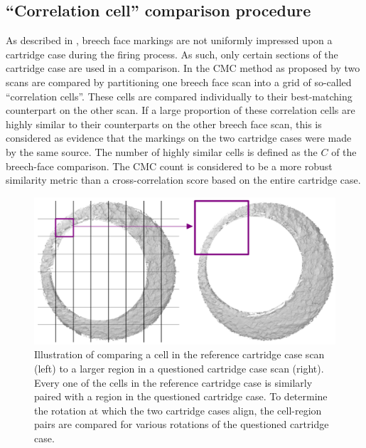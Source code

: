 \hypertarget{comparisonProcedure}{%
\subsection{``Correlation cell'' comparison
procedure}\label{comparisonProcedure}}

As described in \citet{song_proposed_2013}, breech face markings are not
uniformly impressed upon a cartridge case during the firing process. As
such, only certain sections of the cartridge case are used in a
comparison. In the CMC method as proposed by \citet{song_proposed_2013}
two scans are compared by partitioning one breech face scan into a grid
of so-called ``correlation cells''. These cells are compared
individually to their best-matching counterpart on the other scan. If a
large proportion of these correlation cells are highly similar to their
counterparts on the other breech face scan, this is considered as
evidence that the markings on the two cartridge cases were made by the
same source. The number of highly similar cells is defined as the
 \(C\) \citep{song_proposed_2013} of the breech-face
comparison. The CMC count is considered to be a more robust similarity
metric than a cross-correlation score based on the entire cartridge
case.

\begin{Schunk}
\begin{figure}[htbp]

{\centering \includegraphics[width=.75\textwidth]{images/cmc_illustration} 

}

\caption{\label{fig:cmc_illustration} Illustration of comparing a cell in the reference cartridge case scan (left) to a larger region in a questioned cartridge case scan (right). Every one of the cells in the reference cartridge case is similarly paired with a region in the questioned cartridge case.  To determine the rotation at which the two cartridge cases align, the cell-region pairs are compared for various rotations of the questioned cartridge case.}\label{fig:unnamed-chunk-11}
\end{figure}
\end{Schunk}

